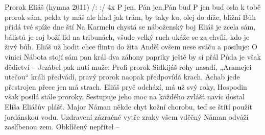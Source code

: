 \begin{TEXT}{Prorok Eliáš (hymna 2011)}
\REFREN  /:  :/                      4x \NL
  P jen, Pán jen,Pán buď  \NL             %
P jen  buď osla 
\SLOKA {} k tobě prorok sám,  pekla \NL
	ty máš ale hlad jak trám,  by taky \NL
	ku, olej  do díže,  bližní\NL
	 Bůh přidá  tvé spíže  dne ští
\SLOKA Na Karmelu chystá se náboženský boj\NL
	Eliáš je zcela sám, bálistů je roj\NL
	boží lid na tribunách, všude velký ruch\NL
	ukáže se za chvíli, kdo je živý bůh.
\SLOKA Eliáš už hodit chce flintu do žita\NL
	\NL
	Anděl ovšem nese sváču a posiluje:\NL
\SLOKA O vinici Nábota stojí sám pan král\NL
	dva záhony papriky ještě by si přál\NL
	Půda je však dědictví -- \NL
	Jezábel pak nutí muže: 
\SLOKA Profi-prorok Sidkijáš rohy nasadí, \NL
	„Aramejci utečou“ králi předvádí, \NL
	pravý prorok naopak předpovídá krach, \NL
	Achab jede přestrojen přece jen má strach.\pagebreak
\SLOKA Eliáš pryč odchází, má už svý roky,\NL
	Hospodin však posílá stále proroky.\NL
	Sestupuje jeho moc na každého zvlášť\NL
	navíc dostal Elíša Eliášův plášť. 
\SLOKA Major Náman někde chyt kožní chorobu, \NL
	teď se štítí použít jordánskou vodu. \NL
	Uzdravení zázračné vytře zraky všem \NL
	vděčný Náman odváží zaslíbenou zem.
\SLOKA Obklíčený nepřítel -- \NL
\REFREN 	
\end{TEXT}
